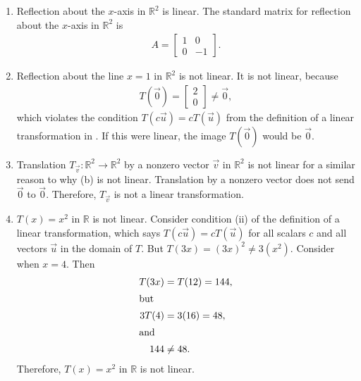\documentclass[10pt,letterpaper,final]{report}
\begin{document}
\begin{enumerate}[label=(\alph*)]
  \item Reflection about the $x$-axis in $\mathbb{R}^2$ is linear. The standard matrix for reflection about the $x$-axis in $\mathbb{R}^2$ is
        \begin{align*}
          A = \begin{bmatrix}
                1 & 0  \\
                0 & -1
              \end{bmatrix}.
        \end{align*}

  \item Reflection about the line $x = 1$ in $\mathbb{R}^2$ is not linear. It is not linear, because
        \begin{align*}
          T(\vec{0}) = \begin{bmatrix}
                         2 \\
                         0
                       \end{bmatrix} \neq \vec{0},
        \end{align*}
        which violates the condition $T(c\vec{u}) = cT(\vec{u})$ from the definition of a linear transformation in \cite[Ch.~1, p.~70]{LayEtAl2020LinearAlgebraAndItsApplications}. If this were linear, the image $T(\vec{0})$ would be $\vec{0}$.

  \item Translation $T_{\vec{v}}: \mathbb{R}^2 \to \mathbb{R}^2$ by a nonzero vector $\vec{v}$ in $\mathbb{R}^2$ is not linear for a similar reason to why (b) is not linear. Translation by a nonzero vector does not send $\vec{0}$ to $\vec{0}$. Therefore, $T_{\vec{v}}$ is not a linear transformation.

  \item $T(x) = x^2$ in $\mathbb{R}$ is not linear. Consider condition (ii) of the definition of a linear transformation, which says $T(c\vec{u}) = cT(\vec{u})$ for all scalars $c$ and all vectors $\vec{u}$ in the domain of $T$. But $T(3x) = (3x)^2 \neq 3(x^2)$. Consider when $x = 4$. Then
        \begin{align*}
          T(3x) & = T(12) = 144, \\
          \intertext{but}
          3T(4) & = 3(16) = 48,  \\
          \intertext{and}
          144   & \neq 48.
        \end{align*}
        Therefore, $T(x) = x^2$ in $\mathbb{R}$ is not linear.


\end{enumerate}
\end{document}
